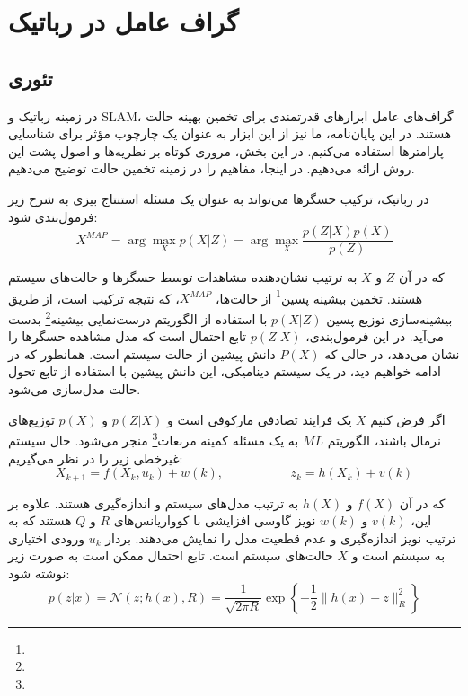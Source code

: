 \chapter{گراف عامل در رباتیک} \label{sec:appendix1}

\section{تئوری}

در زمینه رباتیک و SLAM، گراف‌های عامل ابزارهای قدرتمندی برای تخمین بهینه حالت هستند. در این پایان‌نامه، ما نیز از این ابزار به عنوان یک چارچوب مؤثر برای شناسایی پارامترها استفاده می‌کنیم. در این بخش، مروری کوتاه بر نظریه‌ها و اصول پشت این روش ارائه می‌دهیم. در اینجا، مفاهیم را در زمینه تخمین حالت توضیح می‌دهیم.

در رباتیک، ترکیب حسگرها می‌تواند به عنوان یک مسئله استنتاج بیزی به شرح زیر فرمول‌بندی شود:
\begin{equation} \label{eq:MAP}
	X^{MAP} = \arg\max_X p(X|Z) = \arg\max_X \frac{p(Z|X)p(X)}{p(Z)}
\end{equation}

که در آن \(Z\) و \(X\) به ترتیب نشان‌دهنده مشاهدات توسط حسگرها و حالت‌های سیستم هستند. تخمین بیشینه پسین\footnote{}
 از حالت‌ها، \(X^{MAP}\)، که نتیجه ترکیب است، از طریق بیشینه‌سازی توزیع پسین \(p(X|Z)\) با استفاده از الگوریتم درست‌نمایی بیشینه\footnote{}
بدست می‌آید. در این فرمول‌بندی، \(p(Z|X)\) تابع احتمال است که مدل مشاهده حسگرها را نشان می‌دهد، در حالی که \(P(X)\) دانش پیشین از حالت سیستم است. همانطور که در ادامه خواهیم دید، در یک سیستم دینامیکی، این دانش پیشین با استفاده از تابع تحول حالت مدل‌سازی می‌شود.

اگر فرض کنیم \(X\) یک فرایند تصادفی مارکوفی است و \(p(Z|X)\) و \(p(X)\) توزیع‌های نرمال باشند، الگوریتم $ML$ به یک مسئله کمینه مربعات\footnote{}
 منجر می‌شود.  حال سیستم غیرخطی زیر را در نظر می‌گیریم:
\begin{equation}
	X_{k+1} = f(X_k, u_k) + w(k), \text{~~~~~~~~~~~~~~~~} z_k = h(X_k) + v(k)
\end{equation}


که در آن \(f(X)\) و \(h(X)\) به ترتیب مدل‌های سیستم و اندازه‌گیری هستند. علاوه بر این، \(v(k)\) و \(w(k)\) نویز گاوسی افزایشی با کوواریانس‌های \(R\) و \(Q\) هستند که به ترتیب نویز اندازه‌گیری و عدم قطعیت مدل را نمایش می‌دهند. بردار \(u_k\) ورودی اختیاری به سیستم است و \(X\) حالت‌های سیستم است. تابع احتمال ممکن است به صورت زیر نوشته شود:
\begin{equation} \label{eq:Gauess_Dis_h}
	p(z|x) = \mathcal{N}(z; h(x), R) = \frac{1}{\sqrt{2\pi R}} \exp \left\{ -\frac{1}{2} \| h(x) - z \|_R^2 \right\}
\end{equation}

